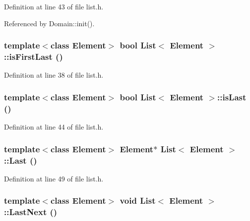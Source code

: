 Definition at line 43 of file list.h.

Referenced by Domain::init().\hypertarget{classList_a51d4b73577c4875f1c4ad82b7aa388c}{
\subsubsection[{isFirstLast}]{\setlength{\rightskip}{0pt plus 5cm}template$<$class Element$>$ bool {\bf List}$<$ Element $>$::isFirstLast ()}}
\label{classList_a51d4b73577c4875f1c4ad82b7aa388c}




Definition at line 38 of file list.h.\hypertarget{classList_72c834a30a14c91afbcb4a23537a7a95}{
\subsubsection[{isLast}]{\setlength{\rightskip}{0pt plus 5cm}template$<$class Element$>$ bool {\bf List}$<$ Element $>$::isLast ()}}
\label{classList_72c834a30a14c91afbcb4a23537a7a95}




Definition at line 44 of file list.h.\hypertarget{classList_191fcfa17a21244d46e47d848f361cdf}{
\subsubsection[{Last}]{\setlength{\rightskip}{0pt plus 5cm}template$<$class Element$>$ Element$\ast$ {\bf List}$<$ Element $>$::Last ()}}
\label{classList_191fcfa17a21244d46e47d848f361cdf}




Definition at line 49 of file list.h.\hypertarget{classList_16464ad4ad6ecb1daef625d2cad44db2}{
\subsubsection[{LastNext}]{\setlength{\rightskip}{0pt plus 5cm}template$<$class Element$>$ void {\bf List}$<$ Element $>$::LastNext ()}}
\label{classList_16464ad4ad6ecb1daef625d2cad44db2}




